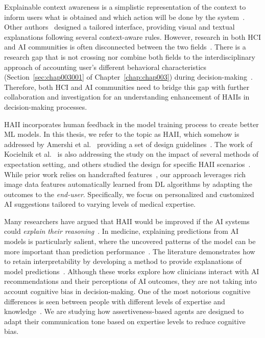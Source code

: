 Explainable context awareness is a simplistic representation of the context to inform users what is obtained and which action will be done by the system~\cite{10.1145/3313831.3376545}.
Other authors~\cite{Kocielnik:2019:YAI:3290605.3300641} designed a tailored interface, providing visual and textual explanations following several context-aware rules.
However, research in both \ac{HCI} and \ac{AI} communities is often disconnected between the two fields~\cite{10.1145/3173574.3174156, 10.1145/3313831.3376807}.
There is a research gap that is not crossing nor combine both fields to the interdisciplinary approach of accounting user's different behavioral characteristics (Section~\ref{sec:chap003001} of Chapter~\ref{chap:chap003}) during decision-making~\cite{10.1145/3173574.3174156}.
Therefore, both \ac{HCI} and \ac{AI} communities need to bridge this gap with further collaboration and investigation for an understanding enhancement of \acp{HAII} in decision-making processes.

\ac{HAII} incorporates human feedback in the model training process to create better \ac{ML} models.
In this thesis, we refer to the topic as \ac{HAII}, which somehow is addressed by Amershi et al.~\cite{10.1145/3290605.3300233} providing a set of design guidelines~\cite{10.1145/3132272.3134111}.
The work of Kocielnik et al.~\cite{Kocielnik:2019:YAI:3290605.3300641} is also addressing the study on the impact of several methods of expectation setting, and others studied the design for specific \ac{HAII} scenarios~\cite{aha2017ai}.
While prior work relies on handcrafted features~\cite{10.1145/3290605.3300233, Kocielnik:2019:YAI:3290605.3300641}, our approach leverages rich image data features automatically learned from \ac{DL} algorithms by adapting the outcomes to the {\it end-user}.
Specifically, we focus on personalized and customized \ac{AI} suggestions tailored to varying levels of medical expertise.

Many researchers have argued that \ac{HAII} would be improved if the \ac{AI} systems could {\it explain their reasoning}~\cite{10.1145/3411764.3445717, Rudin2022, Kawamleh2022}.
In medicine, explaining predictions from \ac{AI} models is particularly salient, where the uncovered patterns of the model can be more important than prediction performance~\cite{Lundberg2020}.
The literature demonstrates how to retain interpretability by developing a method to provide explanations of model predictions~\cite{10.1145/3544548.3580682}.
Although these works explore how clinicians interact with \ac{AI} recommendations and their perceptions of \ac{AI} outcomes, they are not taking into account cognitive bias in decision-making.
One of the most notorious cognitive differences is seen between people with different levels of expertise and knowledge~\cite{https://doi.org/10.1111/nuf.12430, Seidel2021}.
We are studying how assertiveness-based agents are designed to adapt their communication tone based on expertise levels to reduce cognitive bias.

